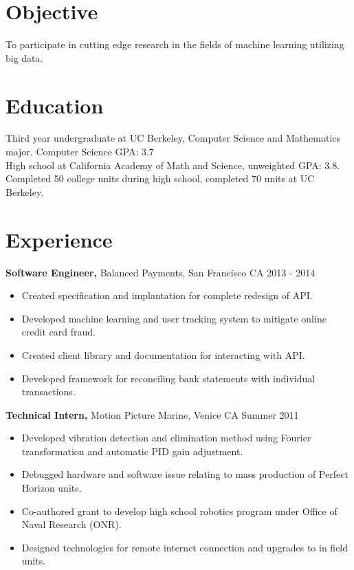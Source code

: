 \documentclass[margin]{res}
\begin{document}
\begin{resume}

\section{Objective}
To participate in cutting edge research in the fields of machine learning utilizing big data.

\section{Education}
Third year undergraduate at UC Berkeley, Computer Science and Mathematics major.  Computer Science GPA: 3.7 \\
High school at California Academy of Math and Science, unweighted GPA: 3.8. \\
Completed 50 college units during high school, completed 70 units at UC Berkeley.


\section{Experience}
{\bf Software Engineer,} Balanced Payments, San Francisco CA \hfill 2013 - 2014
\begin{itemize} \itemsep -2pt
  \item Created specification and implantation for complete redesign of API.
  \item Developed machine learning and user tracking system to mitigate online credit card fraud.
  \item Created client library and documentation for interacting with API.
  \item Developed framework for reconciling bank statements with individual transactions.
\end{itemize}

{\bf Technical Intern,} Motion Picture Marine, Venice CA \hfill Summer 2011
\begin{itemize} \itemsep -2pt  %
  \item Developed vibration detection and elimination method using Fourier transformation and automatic PID gain adjustment.
  \item Debugged hardware and software issue relating to mass production of Perfect Horizon units.
  \item Co-authored grant to develop high school robotics program under Office of Naval Research (ONR).
  \item Designed technologies for remote internet connection and upgrades to in field units.
\end{itemize}



\end{resume}
\end{document}
